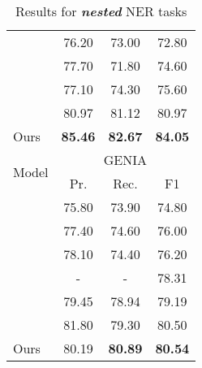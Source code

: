 \documentclass[11pt,a4paper]{article}
\begin{document}
\begin{table}[t]
\begin{tabular}{lccc}
\citet{DBLP:conf/tac/JiPZNMMC17}       & 76.20 & 73.00 & 72.80  \\
\citet{lin-etal-2019-sequence}       & 77.70  & 71.80 & 74.60  \\
\citet{luo-zhao-2020-bipartite}       & 77.10 & 74.30 & 75.60  \\
\citet{li-etal-2020-unified} & 80.97  & 81.12  & 80.97  \\
\midrule
Ours    & \textbf{85.46}  & \textbf{82.67}  & \textbf{84.05}  \\
\bottomrule
\toprule
\multirow{2}{*}{Model}   & \multicolumn{3}{c}{GENIA}  \\
 \cmidrule(lr){2-4} 
& Pr.  & Rec. & F1  \\
\midrule









\citet{lin-etal-2019-sequence}       & 75.80  & 73.90 & 74.80  \\
\citet{luo-zhao-2020-bipartite}       & 77.40  & 74.60  & 76.00    \\
\citet{wang-etal-2020-hit}       & 78.10  & 74.40  & 76.20  \\
\citet{strakova-etal-2019-neural}  & - & - &  78.31 \\
\citet{wang-etal-2020-pyramid}       & 79.45  & 78.94  & 79.19     \\
\citet{yu-etal-2020-named}       & 81.80  & 79.30  & 80.50     \\
\midrule
Ours    & 80.19 & \textbf{80.89}  & \textbf{80.54}  \\
\bottomrule

\end{tabular}
\caption{Results for \textit{\textbf{nested}} NER tasks}
\label{tab:nested}
\end{table}
\end{document}
